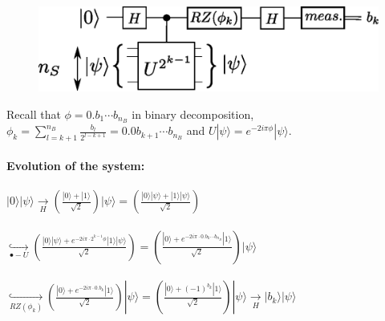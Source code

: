 \documentclass{beamer}
\begin{document}
\begin{frame}
\begin{center}
\begin{figure}
\includegraphics[width=.6\textwidth]{iterative_pea.eps}
\end{figure}
\end{center}
Recall that $\phi=0.b_{1}\cdots b_{n_{B}}$ in binary decomposition,
$\phi_{k}=\sum_{l=k+1}^{n_{B}} \frac{b_{l}}{2^{l-k+1}}=0.0b_{k+1}\cdots b_{n_{B}}$
and $U|\psi\rangle=e^{-2i\pi\phi}|\psi\rangle$.\\~\\
\textbf{Evolution of the system:}\\~\\
$|0\rangle|\psi\rangle \underset{H}{\rightarrow} \left(\frac{|0\rangle+|1\rangle}{\sqrt{2}}\right)|\psi\rangle=
\left(\frac{|0\rangle|\psi\rangle+|1\rangle|\psi\rangle}{\sqrt{2}}\right)$\\~\\
$\underset{\bullet-U}{\hookrightarrow}\left(\frac{|0\rangle|\psi\rangle+e^{-2i\pi\cdot 2^{k-1}\phi}|1\rangle|\psi\rangle}{\sqrt{2}}\right)
=\left(\frac{|0\rangle+e^{-2i\pi\cdot 0.b_{k}\cdots b_{n_{B}}}|1\rangle}{\sqrt{2}}\right)|\psi\rangle$\\~\\
$\underset{RZ(\phi_{k})}{\hookrightarrow} \left(\frac{|0\rangle+e^{-2i\pi\cdot 0.b_{k}}|1\rangle}{\sqrt{2}}\right)|\psi\rangle
=\left(\frac{|0\rangle+(-1)^{b_{k}}|1\rangle}{\sqrt{2}}\right)|\psi\rangle
\underset{H}{\rightarrow}|b_{k}\rangle|\psi\rangle$
\end{frame}
\end{document}

